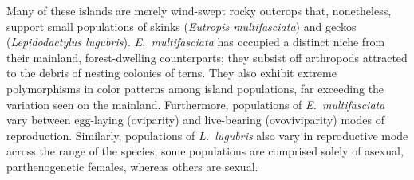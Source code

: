Many of these islands are merely wind-swept rocky outcrops that, nonetheless,
support small populations of skinks (\emph{Eutropis multifasciata}) and geckos
(\emph{Lepidodactylus lugubris}).
\emph{E.\ multifasciata} has occupied a distinct niche from their mainland,
forest-dwelling counterparts; they subsist off arthropods attracted to the
debris of nesting colonies of terns.
They also exhibit extreme polymorphisms in color patterns among island
populations, far exceeding the variation seen on the mainland.
Furthermore, populations of \emph{E.\ multifasciata} vary between egg-laying
(oviparity) and live-bearing (ovoviviparity) modes of reproduction.
Similarly, populations of \emph{L.\ lugubris} also vary in reproductive mode
across the range of the species; some populations are comprised solely of
asexual, parthenogenetic females, whereas others are sexual.

